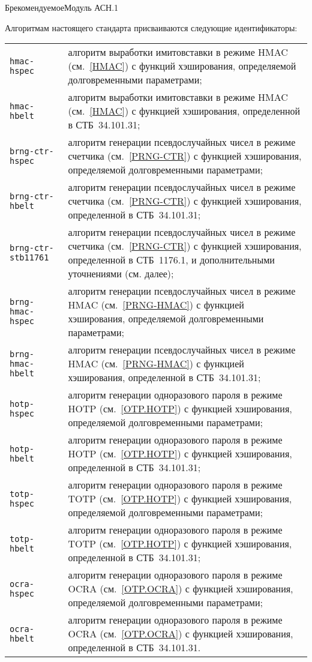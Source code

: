 \begin{appendix}{Б}{рекомендуемое}{Модуль АСН.1}
\label{ASN}


Алгоритмам настоящего стандарта присваиваются следующие идентификаторы:

\noindent
{\tabcolsep 0pt
\begin{longtable}{p{4cm}p{12.5cm}}
\texttt{hmac-hspec} & 
алгоритм выработки имитовставки в режиме HMAC (см.~\ref{HMAC})
с функций хэширования, определяемой долговременными параметрами;\\ 
%
\texttt{hmac-hbelt} & 
алгоритм выработки имитовставки в режиме HMAC (см.~\ref{HMAC})
с функцией хэширования, определенной в СТБ~34.101.31;\\ 
%
\texttt{brng-ctr-hspec} & 
алгоритм генерации псевдослучайных чисел в режиме счетчика 
(см.~\ref{PRNG-CTR})
с функцией хэширования, определяемой долговременными параметрами;\\ 
%
\texttt{brng-ctr-hbelt} & 
алгоритм генерации псевдослучайных чисел в режиме счетчика 
(см.~\ref{PRNG-CTR})
с функцией хэширования, определенной в СТБ~34.101.31;\\ 
%
\texttt{brng-ctr-stb11761} & 
алгоритм генерации псевдослучайных чисел в режиме счетчика 
(см.~\ref{PRNG-CTR})
с функцией хэширования, определенной в СТБ~1176.1, 
и дополнительными уточнениями (см. далее);\\ 
%
\texttt{brng-hmac-hspec} & 
алгоритм генерации псевдослучайных чисел в режиме HMAC 
(см.~\ref{PRNG-HMAC})
с функцией хэширования, определяемой долговременными параметрами;\\ 
%
\texttt{brng-hmac-hbelt} & 
алгоритм генерации псевдослучайных чисел в режиме HMAC 
(см.~\ref{PRNG-HMAC})
с функцией хэширования, определенной в СТБ~34.101.31;\\
%
\texttt{hotp-hspec} & 
алгоритм генерации одноразового пароля в режиме HOTP
(см.~\ref{OTP.HOTP}) с функцией хэширования, 
определяемой долговременными параметрами;\\ 
%
\texttt{hotp-hbelt} & 
алгоритм генерации одноразового пароля в режиме HOTP
(см.~\ref{OTP.HOTP}) с функцией хэширования, определенной в СТБ~34.101.31;\\ 
%
\texttt{totp-hspec} & 
алгоритм генерации одноразового пароля в режиме TOTP
(см.~\ref{OTP.HOTP}) с функцией хэширования, 
определяемой долговременными параметрами;\\ 
%
\texttt{totp-hbelt} & 
алгоритм генерации одноразового пароля в режиме TOTP
(см.~\ref{OTP.HOTP}) с функцией хэширования, определенной в СТБ~34.101.31;\\ 
%
\texttt{ocra-hspec} & 
алгоритм генерации одноразового пароля в режиме OCRA
(см.~\ref{OTP.OCRA}) с функцией хэширования, 
определяемой долговременными параметрами;\\ 
%
\texttt{ocra-hbelt} & 
алгоритм генерации одноразового пароля в режиме OCRA
(см.~\ref{OTP.OCRA}) с функцией хэширования, определенной в СТБ~34.101.31.
\end{longtable}
}


\end{appendix}
